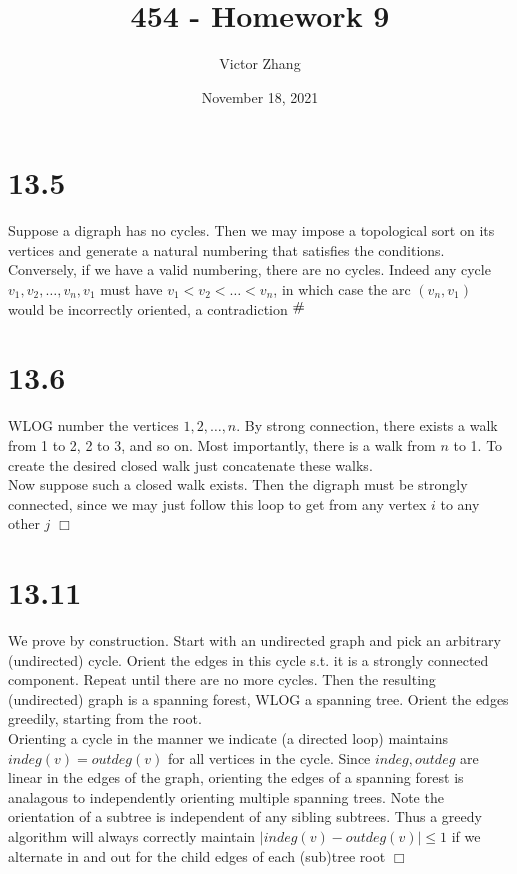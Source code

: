 \documentclass{article}
\title{454 - Homework 9}
\author{Victor Zhang}
\date{November 18, 2021}
\newcommand{\contra}{\raisebox{\depth}{\#}}
\begin{document}
\maketitle

\section*{13.5}
Suppose a digraph has no cycles. Then we may impose a topological sort on its vertices and generate a natural numbering that satisfies the conditions. Conversely, if we have a valid numbering, there are no cycles. Indeed any cycle $v_1, v_2, \dots, v_n, v_1$ must have $v_1 < v_2 < \dots < v_n$, in which case the arc $(v_n, v_1)$ would be incorrectly oriented, a contradiction $\contra$

\section*{13.6}
WLOG number the vertices $1,2,\dots, n$. By strong connection, there exists a walk from 1 to 2, 2 to 3, and so on. Most importantly, there is a walk from $n$ to 1. To create the desired closed walk just concatenate these walks.\\
Now suppose such a closed walk exists. Then the digraph must be strongly connected, since we may just follow this loop to get from any vertex $i$ to any other $j$ $\Box$

\section*{13.11}
We prove by construction. Start with an undirected graph and pick an arbitrary (undirected) cycle. Orient the edges in this cycle s.t. it is a strongly connected component. Repeat until there are no more cycles. Then the resulting (undirected) graph is a spanning forest, WLOG a spanning tree. Orient the edges greedily, starting from the root.\\
Orienting a cycle in the manner we indicate (a directed loop) maintains $indeg(v) = outdeg(v)$ for all vertices in the cycle. Since $indeg, outdeg$ are linear in the edges of the graph, orienting the edges of a spanning forest is analagous to independently orienting multiple spanning trees. Note the orientation of a subtree is independent of any sibling subtrees. Thus a greedy algorithm will always correctly maintain $|indeg(v) - outdeg(v)| \leq 1$ if we alternate in and out for the child edges of each (sub)tree root $\Box$
\end{document}
